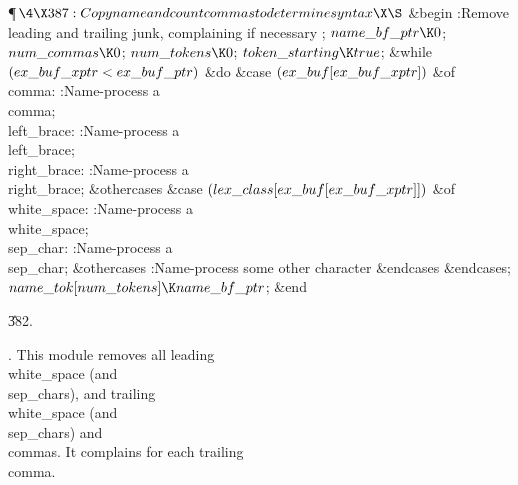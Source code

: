 \Y\P$\4\X387:Copy name and count \\{comma}s to determine syntax\X\S$\6
\&{begin} :Remove leading and trailing junk, complaining if necessary%
\X;\6
$\\{name\_bf\_ptr}\K0$;\5
$\\{num\_commas}\K0$;\5
$\\{num\_tokens}\K0$;\6
$\\{token\_starting}\K\\{true}$;\6
\&{while} $(\\{ex\_buf\_xptr}<\\{ex\_buf\_ptr})$ \1\&{do}\6
\&{case} $(\\{ex\_buf}[\\{ex\_buf\_xptr}])$ \1\&{of}\6
\4\\{comma}: :Name-process a \\{comma}\X;\6
\4\\{left\_brace}: :Name-process a \\{left\_brace}\X;\6
\4\\{right\_brace}: :Name-process a \\{right\_brace}\X;\6
\4\&{othercases} \&{case} $(\\{lex\_class}[\\{ex\_buf}[\\{ex\_buf\_xptr}]])$
\1\&{of}\6
\4\\{white\_space}: :Name-process a \\{white\_space}\X;\6
\4\\{sep\_char}: :Name-process a \\{sep\_char}\X;\6
\4\&{othercases} :Name-process some other character\X\2\6
\&{endcases}\2\6
\&{endcases};\2\6
$\\{name\_tok}[\\{num\_tokens}]\K\\{name\_bf\_ptr}$;\6
\&{end}\par
\U382.\fi

.
This module removes all leading \\{white\_space} (and \\{sep\_char}s), and
trailing \\{white\_space} (and \\{sep\_char}s) and \\{comma}s.  It complains
for each trailing \\{comma}.

